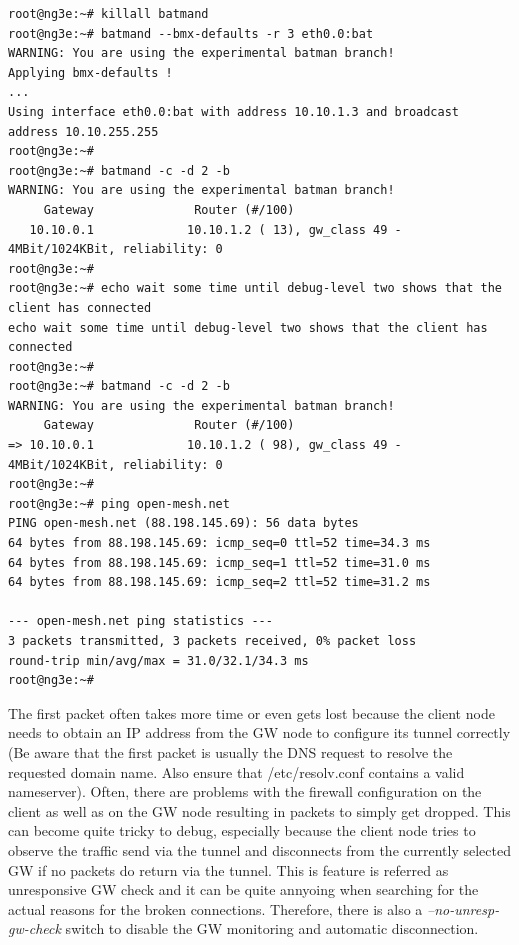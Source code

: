 \documentclass[11pt]{article}
\begin{document}
\begin{enumerate}
\begin{small} \begin{verbatim}
root@ng3e:~# killall batmand
root@ng3e:~# batmand --bmx-defaults -r 3 eth0.0:bat
WARNING: You are using the experimental batman branch!
Applying bmx-defaults !
...
Using interface eth0.0:bat with address 10.10.1.3 and broadcast address 10.10.255.255
root@ng3e:~# 
root@ng3e:~# batmand -c -d 2 -b
WARNING: You are using the experimental batman branch!
     Gateway              Router (#/100)
   10.10.0.1             10.10.1.2 ( 13), gw_class 49 - 4MBit/1024KBit, reliability: 0
root@ng3e:~#
root@ng3e:~# echo wait some time until debug-level two shows that the client has connected
echo wait some time until debug-level two shows that the client has connected
root@ng3e:~#
root@ng3e:~# batmand -c -d 2 -b
WARNING: You are using the experimental batman branch!
     Gateway              Router (#/100)
=> 10.10.0.1             10.10.1.2 ( 98), gw_class 49 - 4MBit/1024KBit, reliability: 0
root@ng3e:~#
root@ng3e:~# ping open-mesh.net
PING open-mesh.net (88.198.145.69): 56 data bytes
64 bytes from 88.198.145.69: icmp_seq=0 ttl=52 time=34.3 ms
64 bytes from 88.198.145.69: icmp_seq=1 ttl=52 time=31.0 ms
64 bytes from 88.198.145.69: icmp_seq=2 ttl=52 time=31.2 ms

--- open-mesh.net ping statistics ---
3 packets transmitted, 3 packets received, 0% packet loss
round-trip min/avg/max = 31.0/32.1/34.3 ms
root@ng3e:~#
\end{verbatim} \end{small}

The first packet often takes more time or even gets lost because the client node needs to obtain an IP address from the GW node to configure its tunnel correctly (Be aware that the first packet is usually the DNS request to resolve the requested domain name. Also ensure that /etc/resolv.conf contains a valid nameserver).
Often, there are problems with the firewall configuration on the client as well as on the GW node resulting in packets to simply get dropped. 
%
This can become quite tricky to debug, especially because the client node tries to observe the traffic send via the tunnel and disconnects from the currently selected GW if no packets do return via the tunnel. This is feature is referred as unresponsive GW check and it can be quite annyoing when searching for the actual reasons for the broken connections. Therefore, there is also a \emph{--no-unresp-gw-check} switch to disable the GW monitoring and automatic disconnection.


\end{enumerate}
\end{document}
